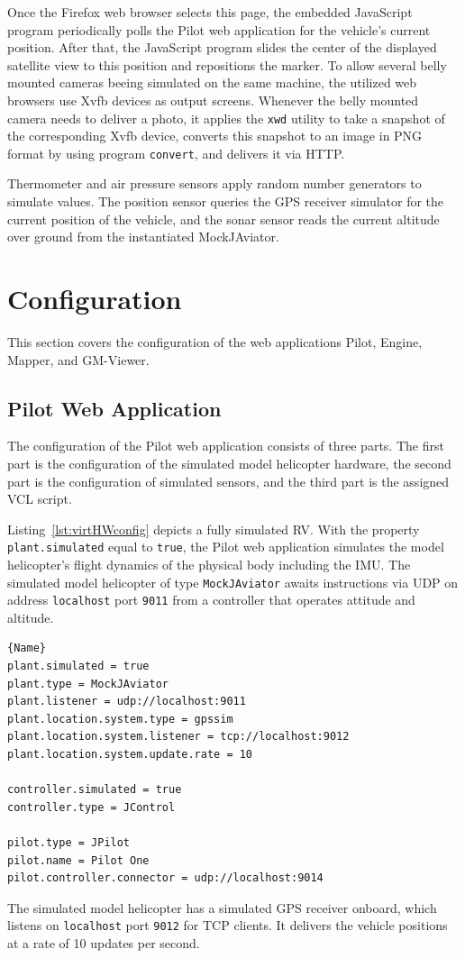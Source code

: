 Once the Firefox web browser selects this page, the embedded JavaScript program periodically polls the Pilot web
application for the vehicle's current position. After that, the JavaScript program slides the center of the
displayed satellite view to this position and repositions the marker.
To allow several belly mounted cameras beeing simulated on the same machine, the utilized web browsers use \ac{Xvfb}
devices as output screens.
%
Whenever the belly mounted camera needs to deliver a photo, it applies the \texttt{xwd} utility to take a snapshot
of the corresponding \ac{Xvfb} device, converts this snapshot to an image in PNG format by using program
\texttt{convert}, and delivers it via \ac{HTTP}.

Thermometer and air pressure sensors apply random number generators to simulate values.
The position sensor queries the GPS receiver simulator for the current position of the vehicle, and the sonar
sensor reads the current altitude over ground from the instantiated MockJAviator.

\section{Configuration}
This section covers the configuration of the web applications Pilot, Engine, Mapper, and GM-Viewer.

\subsection{Pilot Web Application}
The configuration of the Pilot web application consists of three parts. The first part is the configuration of the
simulated model helicopter hardware, the second part is the configuration of simulated sensors, and the third
part is the assigned \ac{VCL} script.

Listing~\ref{lst:virtHWconfig} depicts a fully simulated \ac{RV}. With the property \texttt{plant.simulated} equal
to \texttt{true}, the Pilot web application simulates the model helicopter's flight dynamics of the physical body
including the \ac{IMU}.
The simulated model helicopter of type \texttt{MockJAviator} 
awaits instructions via \acs{UDP} on address \texttt{localhost} port \texttt{9011} from a controller that
operates attitude and altitude. 
\lstset{tabsize=3,language=Tex}
\begin{lstlisting}[caption={Virtual Hardware Configuration Example},mathescape=true,label=lst:virtHWconfig]{Name}
plant.simulated = true
plant.type = MockJAviator
plant.listener = udp://localhost:9011
plant.location.system.type = gpssim
plant.location.system.listener = tcp://localhost:9012
plant.location.system.update.rate = 10

controller.simulated = true
controller.type = JControl

pilot.type = JPilot
pilot.name = Pilot One
pilot.controller.connector = udp://localhost:9014
\end{lstlisting}
The simulated model helicopter has a simulated GPS receiver onboard, which listens on \texttt{localhost} port
\texttt{9012} for \acs{TCP} clients. It delivers the vehicle positions at a rate of 10 updates per second.  

